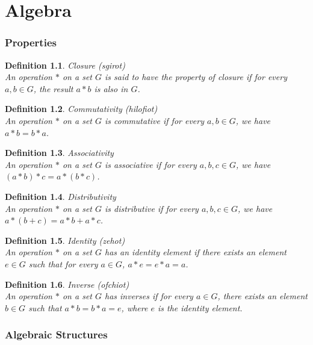 \documentclass[11pt]{book} %
\newtheorem{definition}{Definition}[section]
\begin{document}
\mainmatter
\chapter{Algebra}

\subsection{Properties}
\begin{definition}{Closure (sgirot) } \\
An operation \(*\) on a set \(G\) is said to have the property of closure if for every \(a, b \in G\), the result \(a * b\) is also in \(G\).
\end{definition}

\begin{definition}{Commutativity (hilofiot)} \\
An operation \(*\) on a set \(G\) is commutative if for every \(a, b \in G\), we have \(a * b = b * a\).
\end{definition}

\begin{definition}{Associativity} \\
An operation \(*\) on a set \(G\) is associative if for every \(a, b, c \in G\), we have \((a * b) * c = a * (b * c)\).
\end{definition}

\begin{definition}{Distributivity} \\
An operation \(*\) on a set \(G\) is distributive if for every \(a, b, c \in G\), we have \(a * (b + c) = a * b + a * c\).
\end{definition}

\begin{definition}{Identity (zehot)} \\
An operation \(*\) on a set \(G\) has an identity element if there exists an element \(e \in G\) such that for every \(a \in G\), \(a * e = e * a = a\).
\end{definition}

\begin{definition}{Inverse (ofchiot)} \\
An operation \(*\) on a set \(G\) has inverses if for every \(a \in G\), there exists an element \(b \in G\) such that \(a * b = b * a = e\), where \(e\) is the identity element.
\end{definition}

\subsection{Algebraic Structures}
\end{document}
